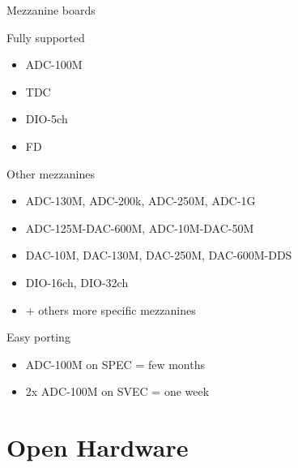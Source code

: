 \documentclass[compress,red]{beamer}
\begin{document}
\begin{frame}{Mezzanine boards}

  \begin{block}{Fully supported}
    \begin{itemize}
    \item
      ADC-100M
    \item
      TDC
    \item
      DIO-5ch
    \item
      FD
    \end{itemize}
  \end{block}

  \begin{block}{Other mezzanines}
    \begin{itemize}
    \item
      ADC-130M, ADC-200k, ADC-250M, ADC-1G
    \item
      ADC-125M-DAC-600M, ADC-10M-DAC-50M
    \item
      DAC-10M, DAC-130M, DAC-250M, DAC-600M-DDS
    \item
      DIO-16ch, DIO-32ch
    \item
      + others more specific mezzanines
    \end{itemize}
  \end{block}

\end{frame}

\begin{frame}{Easy porting}

  \begin{block}{}
    \begin{itemize}
    \item
      ADC-100M on SPEC = few months
    \item
      2x ADC-100M on SVEC = one week
    \end{itemize}
  \end{block}

\end{frame}


\section{Open Hardware}

\end{document}
